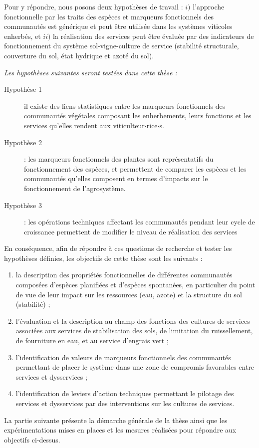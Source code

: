 Pour y répondre, nous posons deux hypothèses de travail : $i)$ l'approche fonctionnelle par les traits des espèces et marqueurs fonctionnels des communautés est générique et peut être utilisée dans les systèmes viticoles enherbés, et $ii)$ la réalisation des services peut être évaluée par des indicateurs de fonctionnement du système sol-vigne-culture de service (stabilité structurale, couverture du sol, état hydrique et azoté du sol). 

\medskip

\noindent \textit{Les hypothèses suivantes seront testées dans cette thèse :}

\begin{description}
\item[Hypothèse 1]\label{c1:h} il existe des liens statistiques entre les marqueurs fonctionnels des communautés végétales composant les enherbements, leurs fonctions et les services qu'elles rendent aux viticulteur$\cdot$rice$\cdot$s.
\item[Hypothèse 2] : les marqueurs fonctionnels des plantes sont représentatifs du fonctionnement des espèces, et permettent de comparer les espèces et les communautés qu'elles composent en termes d'impacts sur le fonctionnement de l'agrosystème.
\item[Hypothèse 3] : les opérations techniques affectant les communautés pendant leur cycle de croissance permettent de modifier le niveau de réalisation des services 

\end{description}

En conséquence, afin de répondre à ces questions de recherche et tester les hypothèses définies, les objectifs de cette thèse sont les suivants :
\begin{enumerate}
\item la description des propriétés fonctionnelles de différentes communautés composées d'espèces planifiées et d'espèces spontanées, en particulier du point de vue de leur impact sur les ressources (eau, azote) et la structure du sol (stabilité) ;
\item l'évaluation et la description au champ des fonctions des cultures de services associées aux services de stabilisation des sols, de limitation du ruissellement, de fourniture en eau, et au service d'engrais vert ;
\item l'identification de valeurs de marqueurs fonctionnels des communautés permettant de placer le système dans une zone de compromis favorables entre services et dysservices ;
\item l'identification de leviers d'action techniques permettant le pilotage des services et dysservices par des interventions sur les cultures de services.
\end{enumerate}

La partie suivante présente la démarche générale de la thèse ainsi que les expérimentations mises en places et les mesures réalisées pour répondre aux objectifs ci-dessus.
